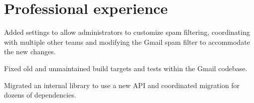 \documentclass{article}
\begin{document}
\maketitle







\section{Professional experience}

\begin{job}[company=Google,
	city={Mountain View, \textsc{ca}},
	dates=June 2019--August 2019,
	title=Software Engineer Intern,
	]
\item Added settings to allow administrators to customize spam filtering,
coordinating with multiple other teams and modifying the Gmail spam filter
to accommodate the new changes.
\item Fixed old and unmaintained build targets and tests within the Gmail
codebase.
\item Migrated an internal library to use a new API and coordinated
migration for dozens of dependencies.
\end{job}
\end{document}

